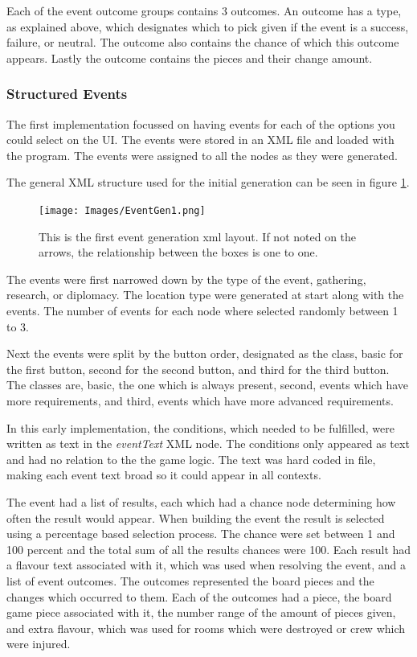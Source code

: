 Each of the event outcome groups contains 3 outcomes. An outcome has a type, as explained above, which designates which to pick given if the event is a success, failure, or neutral. The outcome also contains the chance of which this outcome appears. Lastly the outcome contains the pieces and their change amount. 

\subsubsection{Structured Events}
The first implementation focussed on having events for each of the options you could select on the UI. The events were stored in an XML file and loaded with the program. The events were assigned to all the nodes as they were generated.

The general XML structure used for the initial generation can be seen in figure \ref{fig:eGen1}.

\begin{figure}[h]
    \centering
    \texttt{[image: Images/EventGen1.png]}
    \caption{This is the first event generation xml layout. If not noted on the arrows, the relationship between the boxes is one to one.}
    \label{fig:eGen1}
\end{figure}

The events were first narrowed down by the type of the event, gathering, research, or diplomacy. The location type were generated at start along with the events. The number of events for each node where selected randomly between 1 to 3.

Next the events were split by the button order, designated as the class, basic for the first button, second for the second button, and third for the third button. 
The classes are, basic, the one which is always present, second, events which have more requirements, and third, events which have more advanced requirements. 


In this early implementation, the conditions, which needed to be fulfilled, were written as text in the \textit{eventText} XML node. The conditions only appeared as text and had no relation to the the game logic. The text was hard coded in file, making each event text broad so it could appear in all contexts.

The event had a list of results, each which had a chance node determining how often the result would appear. When building the event the result is selected using a percentage based selection process. The chance were set between 1 and 100 percent and the total sum of all the results chances were 100. 
Each result had a flavour text associated with it, which was used when resolving the event, and a list of event outcomes. 
The outcomes represented the board pieces and the changes which occurred to them. Each of the outcomes had a piece, the board game piece associated with it, the number range of the amount of pieces given, and extra flavour, which was used for rooms which were destroyed or crew which were injured.

